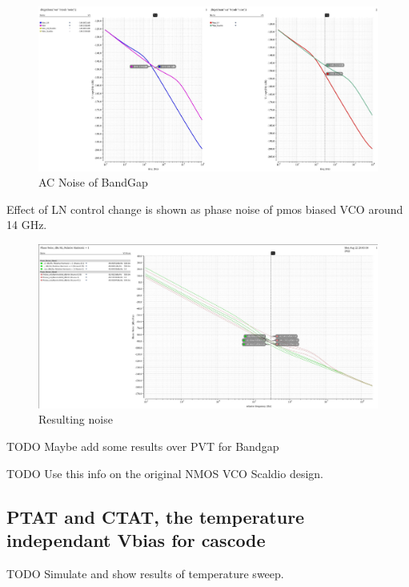 \documentclass{article}
\begin{document}
\begin{figure}[!ht]
	\includegraphics[width=\linewidth]{Figures/ac_noise_Bandgap.jpg}
	\caption{AC Noise of BandGap}
	\label{fig:ac_noise_Bandgap}
\end{figure}


Effect of LN control change is shown as phase noise of pmos biased VCO around 14 GHz. 

\begin{figure}[!ht]
	\includegraphics[width=\linewidth]{Figures/phase_noise_Bandgap_pBias_LNeq0&1.jpg}
	\caption{Resulting noise}
	\label{fig:phase_noise_Bandgap_pBias_LNeq0&1}
\end{figure}

TODO Maybe add some results over PVT for Bandgap

TODO Use this info on the original NMOS VCO Scaldio design.

\subsection{PTAT and CTAT, the temperature independant Vbias for cascode}


TODO Simulate and show results of temperature sweep.


\end{document}
